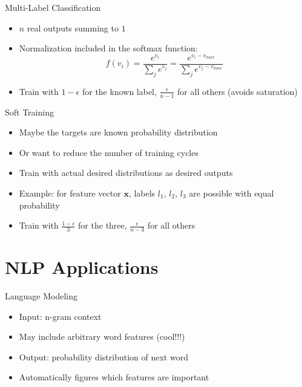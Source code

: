 \documentclass[size=14pt,
  style=tycja,
  paper=screen,
  ]{powerdot}
\begin{document}
\begin{slide}{Multi-Label Classification}
  \begin{itemize}
  \item $n$ real outputs summing to $1$
  \item Normalization included in the softmax function:
  \begin{equation}
    f(v_i) = \displaystyle\frac{e^{v_i}}{\displaystyle\sum_{j} e^{v_j}} = \displaystyle\frac{e^{v_i - v_{max}}}{\displaystyle\sum_{j} e^{v_j-v_{max}}}
  \end{equation}
\item   Train   with   $1   -   \epsilon$   for   the   known   label,
  $\frac{\epsilon}{n-1}$ for all others (avoids saturation)
  \end{itemize}
\end{slide}

\begin{slide}{Soft Training}
  \begin{itemize}
  \item Maybe the targets are known probability distribution 
  \item Or want to reduce the number of training cycles
  \item Train with actual desired distributions as desired outputs
  \item Example:  for feature vector  $\mathbf x$, labels  $l_1$, $l_2$,
    $l_3$ are possible with equal probability
  \item   Train  with   $\frac{1  -   \epsilon}{3}$  for   the  three,
    $\frac{\epsilon}{n-3}$ for all others
  \end{itemize}
\end{slide}

\section{NLP Applications}

\begin{slide}{Language Modeling}
  \begin{itemize}
  \item Input: n-gram context
  \item May include arbitrary word features (cool!!!)
  \item Output: probability distribution of next word
  \item Automatically figures which features are important
  \end{itemize}
\end{slide}
\end{document}
